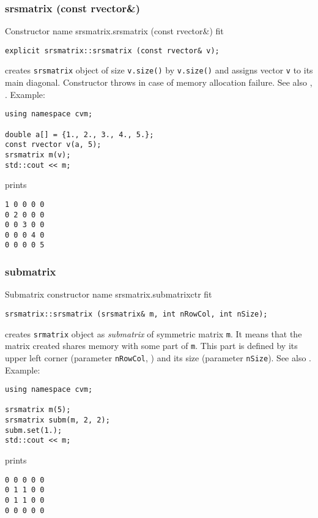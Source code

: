 \subsubsection{srsmatrix (const rvector\&)}
Constructor%
\pdfdest name {srsmatrix.srsmatrix (const rvector&)} fit
\begin{verbatim}
explicit srsmatrix::srsmatrix (const rvector& v);
\end{verbatim}
creates  \verb"srsmatrix" object
of size \verb"v.size()" by \verb"v.size()"
and assigns vector \verb"v" to its main diagonal.
Constructor throws  
in case of memory allocation failure.
See also , .
Example:
\begin{Verbatim}
using namespace cvm;

double a[] = {1., 2., 3., 4., 5.};
const rvector v(a, 5);
srsmatrix m(v);
std::cout << m;
\end{Verbatim}
prints
\begin{Verbatim}
1 0 0 0 0
0 2 0 0 0
0 0 3 0 0
0 0 0 4 0
0 0 0 0 5
\end{Verbatim}
\newpage


\subsubsection{submatrix}
Submatrix constructor%
\pdfdest name {srsmatrix.submatrixctr} fit
\begin{verbatim}
srsmatrix::srsmatrix (srsmatrix& m, int nRowCol, int nSize);
\end{verbatim}
creates  \verb"srmatrix" object as  \emph{submatrix} of 
symmetric matrix \verb"m".
It means that the matrix created shares memory with some part
of \verb"m". This part is defined by its upper left corner (parameter
\verb"nRowCol", \Based)
and its size (parameter \verb"nSize").
See also .
Example:
\begin{Verbatim}
using namespace cvm;

srsmatrix m(5);
srsmatrix subm(m, 2, 2);
subm.set(1.);
std::cout << m;
\end{Verbatim}
prints
\begin{Verbatim}
0 0 0 0 0
0 1 1 0 0
0 1 1 0 0
0 0 0 0 0
\end{Verbatim}
\newpage



